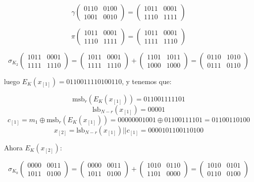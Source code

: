 \documentclass[a4paper]{article}
\begin{document}
$$\gamma \begin{pmatrix} 0110 & 0100 \\ 1001 & 0010 \end{pmatrix} = \begin{pmatrix} 1011 & 0001 \\ 1110 & 1111 \end{pmatrix}$$

$$\pi \begin{pmatrix} 1011 & 0001 \\ 1110 & 1111 \end{pmatrix} = \begin{pmatrix} 1011 & 0001 \\ 1111 & 1110 \end{pmatrix}$$

$$\sigma_{K_2} \begin{pmatrix} 1011 & 0001 \\ 1111 & 1110 \end{pmatrix} = \begin{pmatrix} 1011 & 0001 \\ 1111 & 1110 \end{pmatrix} + \begin{pmatrix} 1101 & 1011 \\ 1000 & 1000 \end{pmatrix} = \begin{pmatrix} 0110 & 1010 \\ 0111 & 0110 \end{pmatrix}$$


luego $E_K(x_{[1]}) = 0110 0111 1010 0110$, y tenemos que:

$$\text{msb}_r (E_K(x_{[1]})) = 0110 01111 101$$
$$\text{lsb}_{N-r} (x_{[1]}) = 00001$$
$$c_{[1]} = m_1 \oplus \text{msb}_r(E_K(x_{[1]})) = 0000 0001 001 \oplus 0110 0111 101 = 0110 0110 100$$
$$x_{[2]} = \text{lsb}_{N-r} (x_{[1]}) || c_{[1]} = 0000 1011 0011 0100$$

Ahora $E_K(x_{[2]})$:

$$\sigma_{K_0} \begin{pmatrix} 0000 & 0011 \\ 1011 & 0100 \end{pmatrix} = \begin{pmatrix} 0000 & 0011 \\ 1011 & 0100 \end{pmatrix} + \begin{pmatrix} 1010 & 0110 \\ 1101 & 0000 \end{pmatrix} = \begin{pmatrix} 1010 & 0101 \\ 0110 & 0100 \end{pmatrix}$$
\end{document}
